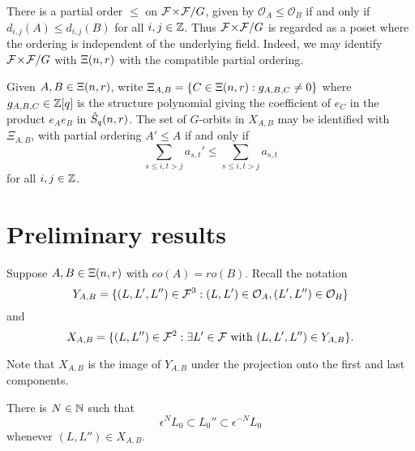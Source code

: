\documentclass[a4paper, 11pt]{report}
\begin{document}

There is a partial order $\le$ on ${\mathcal{F}\!\times\!\mathcal{F}}/G$, given by $\mathcal{O}_A\le \mathcal{O}_B$ if and only if $d_{i,j}(A)\le d_{i,j}(B)$ for all $i,j\in\mathbb{Z}$. Thus ${\mathcal{F}\!\times\!\mathcal{F}}/G$ is regarded as a poset where the ordering is independent of the underlying field. Indeed, we may identify ${\mathcal{F}\!\times\!\mathcal{F}}/G$ with $\Xi(n,r)$ with the compatible partial ordering.

Given $A,B\in\Xi(n,r)$, write $\Xi_{A,B} = \{C\in\Xi(n,r): g_{A,B,C}\neq 0\}$ where $g_{A,B,C}\in\mathbb{Z}[q]$ is the structure polynomial giving the coefficient of $e_C$ in the product $e_A e_B$ in $\hat{S}_q(n,r)$. The set of $G$-orbits in $X_{A,B}$ may be identified with $\Xi_{A,B}$, with partial ordering $A'\le A$ if and only if
\begin{equation*}
\sum_{s\le i,t>j} a_{s,t}' \le \sum_{s\le i,t>j} a_{s,t}
\end{equation*}
for all $i,j\in\mathbb{Z}$.

\section{Preliminary results}

Suppose $A,B\in\Xi(n,r)$ with $co(A)=ro(B)$. Recall the notation
\begin{equation*}
Y_{A,B} = \{(L,L',L'')\in\mathcal{F}^3: (L,L')\in\mathcal{O}_A, (L',L'')\in\mathcal{O}_B\}
\end{equation*}
and
\begin{equation*}
X_{A,B} = \{(L,L'')\in\mathcal{F}^2:\exists L'\in\mathcal{F} \text{ with } (L,L',L'')\in Y_{A,B}\}.
\end{equation*}

Note that $X_{A,B}$ is the image of $Y_{A,B}$ under the projection onto the first and last components.

\begin{lemma}\label{lemma:orbit-products-are-bounded}
There is $N\in\mathbb{N}$ such that
\begin{equation*}
\epsilon^N L_0\subset L_0''\subset \epsilon^{-N}L_0
\end{equation*}
whenever $(L,L'')\in X_{A,B}$.
\end{lemma}
\end{document}
